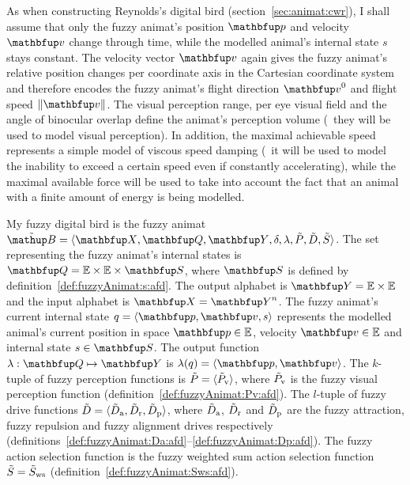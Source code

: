 As when constructing Reynolds's digital bird (section~\ref{sec:animat:cwr}), I shall assume that only the fuzzy animat's position $\vect{p}$ and velocity $\vect{v}$ change through time, while the modelled animal's internal state $s$ stays constant. The velocity vector $\vect{v}$ again gives the fuzzy animat's relative position changes per coordinate axis in the Cartesian coordinate system and therefore encodes the fuzzy animat's flight direction $\vect{v}^0$ and flight speed $\left\|\vect{v}\right\|$. The visual perception range, per eye visual field and the angle of binocular overlap define the animat's perception volume (\ie\ they will be used to model visual perception). In addition, the maximal achievable speed represents a simple model of viscous speed damping (\ie\ it will be used to model the inability to exceed a certain speed even if constantly accelerating), while the maximal available force will be used to take into account the fact that an animal with a finite amount of energy is being modelled.

\begin{definition}
\label{def:fuzzyAnimat:afd}
\hspace*{-.8pt}My fuzzy digital bird is the fuzzy animat $\fautom{B}=\langle\set{X},\set{Q},\set{Y},\delta,\lambda,\ffunc{P},\ffunc{D},\ffunc{S}\rangle$. The set representing the fuzzy animat's internal states is $\set{Q}=\E \times \E \times \set{S}$, where $\set{S}$ is defined by definition~\ref{def:fuzzyAnimat:s:afd}. The output alphabet is $\set{Y}=\E \times \E$ and the input alphabet is $\set{X}=\set{Y}^n$. The fuzzy animat's current internal state $q=\langle\vect{p},\vect{v},s\rangle$ represents the modelled animal's current position in space $\vect{p} \in \E$, velocity $\vect{v} \in \E$ and internal state $s \in \set{S}$. The output function $\lambda: \set{Q} \mapsto \set{Y}$ is $\lambda(q)=\langle\vect{p},\vect{v}\rangle$. The $k$-tuple of fuzzy perception functions is ${\tilde{P}}=\langle{\ensuremath{\tilde{P}}}_\textnormal{v}\rangle$, where ${\tilde{P}}_\textnormal{v}$ is the fuzzy visual perception function (definition~\ref{def:fuzzyAnimat:Pv:afd}). The $l$-tuple of fuzzy drive functions ${\tilde{D}}=\langle{\ensuremath{\tilde{D}}}_\textnormal{a},{\tilde{D}}_\textnormal{r},{\tilde{D}}_\textnormal{p}\rangle$, where ${\tilde{D}}_\textnormal{a}$, ${\tilde{D}}_\textnormal{r}$ and ${\tilde{D}}_\textnormal{p}$ are the fuzzy attraction, fuzzy repulsion and fuzzy alignment drives respectively  (definitions~\ref{def:fuzzyAnimat:Da:afd}--\ref{def:fuzzyAnimat:Dp:afd}). The fuzzy action selection function is the fuzzy weighted sum action selection function ${\tilde{S}}={\tilde{S}}_\textnormal{ws}$ (definition~\ref{def:fuzzyAnimat:Sws:afd}).
\end{definition}


